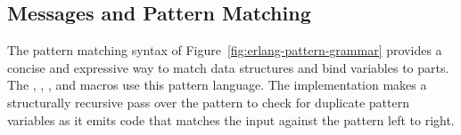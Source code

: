 \subsection {Messages and Pattern Matching}

The pattern matching syntax of Figure~\ref{fig:erlang-pattern-grammar}
provides a concise and expressive way to match data structures and
bind variables to parts. The , ,
, and
 macros use this pattern language. The
implementation makes a structurally recursive pass over the
pattern to check for duplicate pattern variables as it emits
code that matches the input against the pattern left to right.

